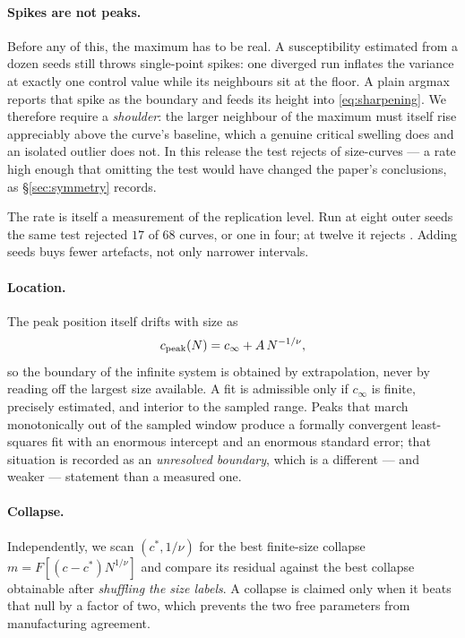 \paragraph{Spikes are not peaks.}
Before any of this, the maximum has to be real. A susceptibility estimated from
a dozen seeds still throws single-point spikes: one diverged run inflates the
variance at exactly one control value while its neighbours sit at the floor. A
plain argmax reports that spike as the boundary and feeds its height into
\eqref{eq:sharpening}. We therefore require a \emph{shoulder}: the larger
neighbour of the maximum must itself rise appreciably above the curve's
baseline, which a genuine critical swelling does and an isolated outlier does
not. In this release the test rejects \AtlasSpikeRejected{} of
\AtlasSpikeTotal{} size-curves --- a rate high enough that omitting the test
would have changed the paper's conclusions, as \S\ref{sec:symmetry} records.

The rate is itself a measurement of the replication level. Run at eight outer
seeds the same test rejected $17$ of $68$ curves, or one in four; at twelve it
rejects \AtlasSpikeRejected{}. Adding seeds buys fewer artefacts, not only
narrower intervals.

\paragraph{Location.} The peak position itself drifts with size as
\begin{equation}
  c_{\rm peak}(N)=c_\infty+A\,N^{-1/\nu},
  \label{eq:drift}
\end{equation}
so the boundary of the infinite system is obtained by extrapolation, never by
reading off the largest size available. A fit is admissible only if $c_\infty$
is finite, precisely estimated, and interior to the sampled range. Peaks that
march monotonically out of the sampled window produce a formally convergent
least-squares fit with an enormous intercept and an enormous standard error;
that situation is recorded as an \emph{unresolved boundary}, which is a
different --- and weaker --- statement than a measured one.

\paragraph{Collapse.} Independently, we scan $(c^\ast,1/\nu)$ for the best
finite-size collapse $m=F\!\left[(c-c^\ast)N^{1/\nu}\right]$ and compare its
residual against the best collapse obtainable after \emph{shuffling the size
labels}. A collapse is claimed only when it beats that null by a factor of two,
which prevents the two free parameters from manufacturing agreement.

